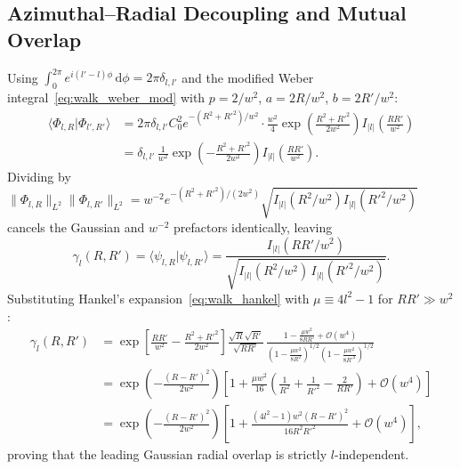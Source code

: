 \documentclass[10pt,letterpaper]{article}
\newcommand{\braket}[2]{\langle #1 | #2 \rangle}
\newcommand{\norm}[1]{\lVert #1 \rVert}
\newcommand{\abs}[1]{\lvert #1 \rvert}
\newcommand{\dd}{\mathrm{d}}
\numberwithin{equation}{section}
\begin{document}
\subsection{Azimuthal--Radial Decoupling and Mutual Overlap}
Using $\int_0^{2\pi} e^{i(l'-l)\phi}\,\dd\phi = 2\pi\delta_{l,l'}$ and the modified Weber integral~\eqref{eq:walk_weber_mod} with $p = 2/w^2$, $a = 2R/w^2$, $b = 2R'/w^2$:
\begin{align}
  \braket{\Phi_{l,R}}{\Phi_{l',R'}} &= 2\pi\delta_{l,l'} C_0^2 e^{-(R^2+R'^2)/w^2} \cdot \frac{w^2}{4}\exp\!\left(\frac{R^2+R'^2}{2w^2}\right) I_{\abs{l}}\!\left(\frac{RR'}{w^2}\right) \nonumber \\
  &= \delta_{l,l'}\,\frac{1}{w^2}\exp\!\left(-\frac{R^2+R'^2}{2w^2}\right) I_{\abs{l}}\!\left(\frac{RR'}{w^2}\right).
\end{align}
Dividing by $\norm{\Phi_{l,R}}_{L^2}\norm{\Phi_{l,R'}}_{L^2} = w^{-2} e^{-(R^2+R'^2)/(2w^2)}\sqrt{I_{\abs{l}}(R^2/w^2)I_{\abs{l}}(R'^2/w^2)}$ cancels the Gaussian and $w^{-2}$ prefactors identically, leaving
\begin{equation}
  \gamma_l(R,R') = \braket{\psi_{l,R}}{\psi_{l,R'}} = \frac{I_{\abs{l}}(RR'/w^2)}{\sqrt{I_{\abs{l}}(R^2/w^2)\,I_{\abs{l}}(R'^2/w^2)}}.
\end{equation}
Substituting Hankel's expansion~\eqref{eq:walk_hankel} with $\mu \equiv 4l^2 - 1$ for $RR' \gg w^2$:
\begin{align}
  \gamma_l(R,R') &= \exp\!\left[\frac{RR'}{w^2} - \frac{R^2 + R'^2}{2w^2}\right] \frac{\sqrt{R}\sqrt{R'}}{\sqrt{RR'}}\,\frac{1 - \frac{\mu w^2}{8RR'} + \mathcal{O}(w^4)}{\left(1 - \frac{\mu w^2}{8R^2}\right)^{1/2}\left(1 - \frac{\mu w^2}{8R'^2}\right)^{1/2}} \nonumber \\
  &= \exp\!\left(-\frac{(R-R')^2}{2w^2}\right)\left[1 + \frac{\mu w^2}{16}\left(\frac{1}{R^2} + \frac{1}{R'^2} - \frac{2}{RR'}\right) + \mathcal{O}(w^4)\right] \nonumber \\
  &= \exp\!\left(-\frac{(R-R')^2}{2w^2}\right)\left[1 + \frac{(4l^2 - 1)w^2(R-R')^2}{16 R^2 R'^2} + \mathcal{O}(w^4)\right],
\end{align}
proving that the leading Gaussian radial overlap is strictly $l$-independent.
\end{document}
